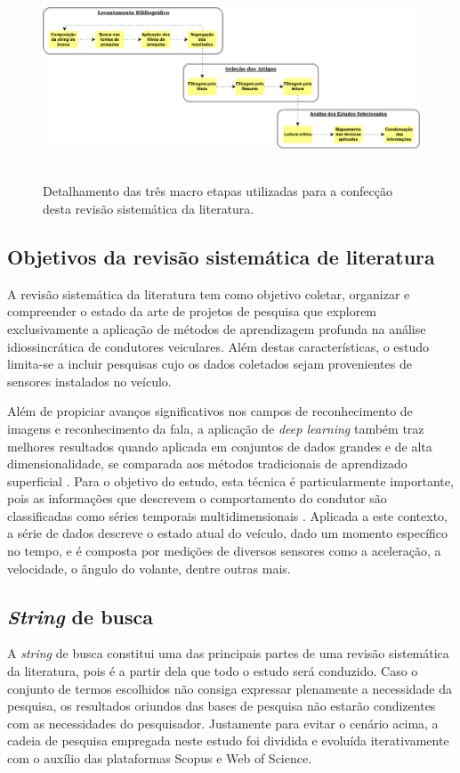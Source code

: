 \documentclass[10pt,journal,compsoc]{IEEEtran}
\begin{document}
\begin{figure}[!t]
\centering
\includegraphics[width=\textwidth, height=6cm]{etapas14}
\caption{Detalhamento das três macro etapas utilizadas para a
  confecção desta revisão sistemática da literatura.}
\label{fig:etapas}
\end{figure}

\subsection{Objetivos da revisão sistemática de literatura}
\label{sec:protocolo:objetivos}
A revisão sistemática da literatura tem como objetivo coletar,
organizar e compreender o estado da arte de projetos de pesquisa que
explorem exclusivamente a aplicação de métodos de aprendizagem
profunda na análise idiossincrática de condutores veiculares. Além
destas características, o estudo limita-se a incluir pesquisas cujo os
dados coletados sejam provenientes de sensores instalados no veículo.

Além de propiciar avanços significativos nos campos de reconhecimento
de imagens e reconhecimento da fala, a aplicação
de \textit{deep learning} também traz melhores resultados quando
aplicada em conjuntos de dados grandes e de alta dimensionalidade,
se comparada aos métodos tradicionais de aprendizado superficial
\cite{Lecun2015436}. Para o objetivo do estudo, esta técnica é particularmente
importante, pois as informações que descrevem o comportamento do condutor são
classificadas como séries temporais multidimensionais
\cite{Liu2018}. Aplicada a este contexto, a série de dados descreve o estado atual do veículo, dado um momento
específico no tempo, e é composta por medições de diversos sensores
como a aceleração, a velocidade, o ângulo do volante, dentre outras mais.

\subsection{\textit{String} de busca}
\label{sec:protocolo:string}
A \textit{string} de busca constitui uma das principais partes de uma
revisão sistemática da literatura, pois é a partir dela que todo o
estudo será conduzido. Caso o conjunto de termos escolhidos não
consiga expressar plenamente a necessidade da pesquisa, os resultados
oriundos das bases de pesquisa não estarão condizentes com as necessidades do
pesquisador. Justamente para evitar o cenário acima, a cadeia de pesquisa
empregada neste estudo foi dividida e evoluída iterativamente com o
auxílio das plataformas Scopus e Web of Science.
\end{document}
